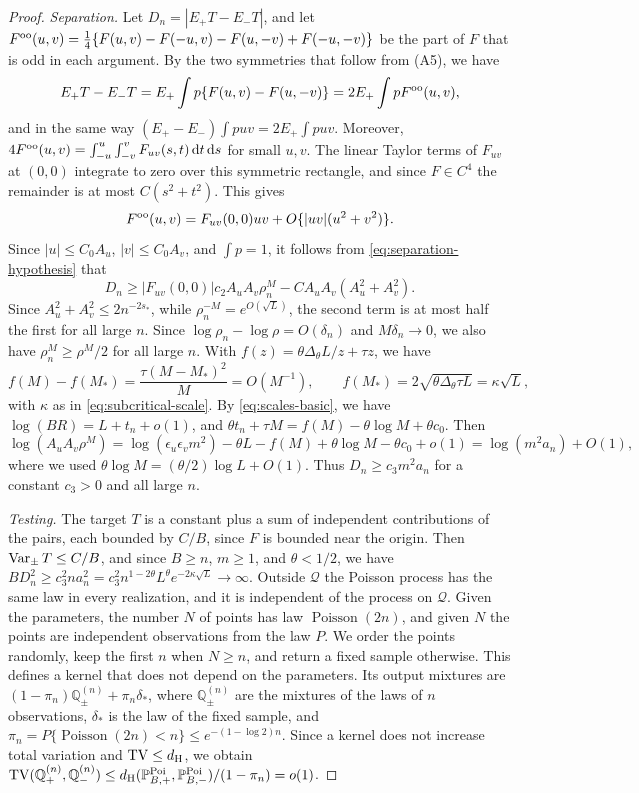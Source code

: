 \begin{proof}
\emph{Separation.} Let $D_n=|E_+T-E_-T|$, and let
$F^{\rm oo}(u,v)=\tfrac14\{F(u,v)-F(-u,v)-F(u,-v)+F(-u,-v)\}$ be the
part of $F$ that is odd in each argument. By the two symmetries that
follow from (A5), we have
\[
 E_+T-E_-T=E_+\int p\{F(u,v)-F(u,-v)\}=2E_+\int pF^{\rm oo}(u,v),
\]
and in the same way $(E_+-E_-)\int puv=2E_+\int puv$. Moreover,
$4F^{\rm oo}(u,v)=\int_{-u}^u\int_{-v}^vF_{uv}(s,t)\,\mathrm d t\,\mathrm d s$ for small
$u,v$. The linear Taylor terms of $F_{uv}$ at $(0,0)$ integrate to zero
over this symmetric rectangle, and since $F\in C^4$ the remainder is
at most $C(s^2+t^2)$. This gives
\[
 F^{\rm oo}(u,v)=F_{uv}(0,0)uv+O\{|uv|(u^2+v^2)\}.
\]
Since $|u|\le C_0A_u$, $|v|\le C_0A_v$, and $\int p=1$, it follows from
\eqref{eq:separation-hypothesis} that
\[
 D_n\ge|F_{uv}(0,0)|c_2A_uA_v\rho_n^M-CA_uA_v(A_u^2+A_v^2).
\]
Since $A_u^2+A_v^2\le2n^{-2s_*}$, while $\rho_n^{-M}=e^{O(\sqrt L)}$, the
second term is at most half the first for all large $n$. Since
$\log\rho_n-\log\rho=O(\delta_n)$ and $M\delta_n\to0$, we also have
$\rho_n^M\ge\rho^M/2$ for all large $n$. With
$f(z)=\theta\Delta_\theta L/z+\tau z$, we have
\[
 f(M)-f(M_*)=\frac{\tau(M-M_*)^2}M=O(M^{-1}),\qquad
 f(M_*)=2\sqrt{\theta\Delta_\theta\tau L}=\kappa\sqrt L,
\]
with $\kappa$ as in \eqref{eq:subcritical-scale}. By
\eqref{eq:scales-basic}, we have $\log(BR)=L+t_n+o(1)$, and
$\theta t_n+\tau M=f(M)-\theta\log M+\theta c_0$. Then
\[
 \log(A_uA_v\rho^M)=\log(\epsilon_u\epsilon_vm^2)-\theta L-f(M)
 +\theta\log M-\theta c_0+o(1)=\log(m^2a_n)+O(1),
\]
where we used $\theta\log M=(\theta/2)\log L+O(1)$. Thus
$D_n\ge c_3m^2a_n$ for a constant $c_3>0$ and all large $n$.

\emph{Testing.} The target $T$ is a constant plus a sum of independent
contributions of the pairs, each bounded by $C/B$, since $F$ is bounded
near the origin. Then $\operatorname{Var}_\pm T\le C/B$, and since $B\ge n$, $m\ge1$,
and $\theta<1/2$, we have
$BD_n^2\ge c_3^2na_n^2=c_3^2n^{1-2\theta}L^\theta e^{-2\kappa\sqrt L}\to\infty$.
Outside $\mathcal Q$ the Poisson process has the same law in every
realization, and it is independent of the process on $\mathcal Q$.
Given the parameters, the number $N$ of points has law
$\operatorname{Poisson}(2n)$, and given $N$ the points are independent
observations from the law $P$. We order the points randomly, keep the first $n$ when $N\ge n$, and
return a fixed sample otherwise. This defines a kernel that does not
depend on the parameters. Its output
mixtures are $(1-\pi_n)\mathbb Q_\pm^{(n)}+\pi_n\delta_*$, where
$\mathbb Q_\pm^{(n)}$ are the mixtures of the laws of $n$ observations,
$\delta_*$ is the law of the fixed sample, and
$\pi_n=P\{\operatorname{Poisson}(2n)<n\}\le e^{-(1-\log2)n}$. Since a
kernel does not increase total variation and $\operatorname{TV}\le d_{\rm H}$, we
obtain
$\operatorname{TV}(\mathbb Q_+^{(n)},\mathbb Q_-^{(n)})
\le d_{\rm H}(\mathbb P^{\rm Poi}_{B,+},\mathbb P^{\rm Poi}_{B,-})/(1-\pi_n)
=o(1)$.


\end{proof}
